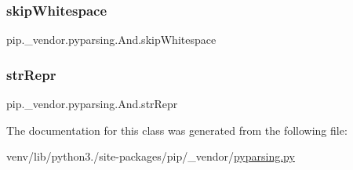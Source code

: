 \subsubsection{\texorpdfstring{skip\+Whitespace}{skipWhitespace}}
{\footnotesize\ttfamily pip.\+\_\+vendor.\+pyparsing.\+And.\+skip\+Whitespace}

\mbox{\label{classpip_1_1__vendor_1_1pyparsing_1_1And_a8128663abb722f0c453630135c44c0c0}} 
\subsubsection{\texorpdfstring{str\+Repr}{strRepr}}
{\footnotesize\ttfamily pip.\+\_\+vendor.\+pyparsing.\+And.\+str\+Repr}



The documentation for this class was generated from the following file\+:\begin{DoxyCompactItemize}
\item 
venv/lib/python3./site-\/packages/pip/\+\_\+vendor/\hyperlink{pip_2__vendor_2pyparsing_8py}{pyparsing.\+py}\end{DoxyCompactItemize}
